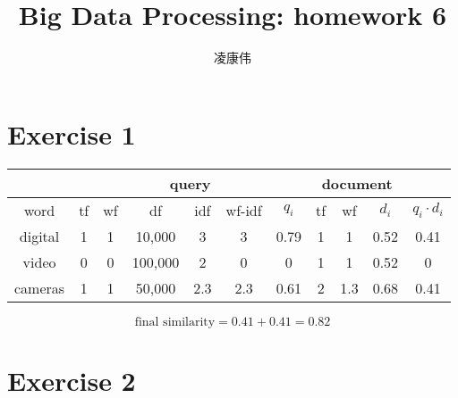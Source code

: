 \documentclass[11pt]{article}
\title{Big Data Processing: homework 6}
\author{凌康伟 \qquad 5140219295}
\begin{document}
\maketitle

\section*{Exercise 1}
\begin{table}[H]
  \centering
  \begin{tabular}{c|c|c|c|c|c|c|c|c|c|c} \hline
    & \multicolumn{6}{c|}{query} & \multicolumn{3}{c|}{document} & \\ \hline
    word & tf & wf & df & idf & wf-idf & $q_i$ & tf & wf & $d_i$ & $q_i\cdot d_i$  \\ \hline
    digital & 1 & 1&10,000 & 3 & 3 & 0.79 & 1 & 1  & 0.52 & 0.41\\ \hline
    video & 0& 0&100,000  & 2  & 0 & 0    & 1 & 1  & 0.52 & 0\\ \hline
    cameras & 1&1 &50,000 & 2.3&2.3&  0.61& 2 &1.3 & 0.68 & 0.41\\ \hline
  \end{tabular}
\end{table}
\[
  \mbox{final similarity} = 0.41 + 0.41 = 0.82
\]

\section*{Exercise 2}
\end{document}

